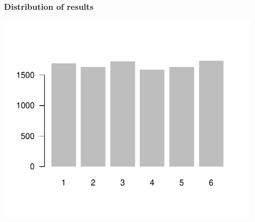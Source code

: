 \documentclass[12pt]{beamer}\usepackage[]{graphicx}\usepackage[]{color}
\newenvironment{knitrout}{}{} %
\begin{document}
\begin{frame}[fragile]
\frametitle{Distribution of results}

\begin{knitrout}\footnotesize
{}\color{fgcolor}

{\centering \includegraphics[width=.7\linewidth,height=.6\linewidth]{figure/unnamed-chunk-29-1} 

}



\end{knitrout}

\end{frame}


\begin{frame}
\begin{center}
\Large{}
\end{center}
\end{frame}

\end{document}
